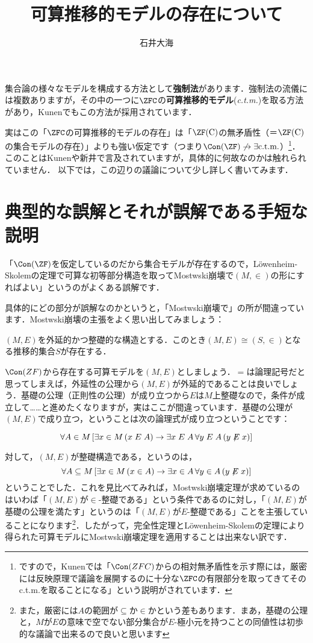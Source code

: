 \documentclass[a4j]{ltjsarticle}
\title{可算推移的モデルの存在について}
\author{石井大海}
\begin{document}
\maketitle

集合論の様々なモデルを構成する方法として\textbf{強制法}があります．強制法の流儀には複数ありますが，その中の一つに$\ZFC$の\textbf{可算推移的モデル}(\textit{c.t.m.})を取る方法があり，Kunen\cite{Kunen:2011}でもこの方法が採用されています．

実はこの「$\ZFC$の可算推移的モデルの存在」は「$\ZF(\mathrm{C})$の無矛盾性（＝$\ZF(\mathrm{C})$の集合モデルの存在）」よりも強い仮定です（つまり$\Con(\ZF) \not\rightarrow \exists \text{c.t.m.}$）\footnote{ですので，Kunenでは「$\Con(ZFC)$からの相対無矛盾性を示す際には，厳密には反映原理で議論を展開するのに十分な$\ZFC$の有限部分を取ってきてそのc.t.m.を取ることになる」という説明がされています．}．このことはKunen\cite{Kunen:2011}や新井\cite{Arai:2011}で言及されていますが，具体的に何故なのかは触れられていません．
以下では，この辺りの議論について少し詳しく書いてみます．

\section{典型的な誤解とそれが誤解である手短な説明}
「$\Con(\ZF)$を仮定しているのだから集合モデルが存在するので，L\"{o}wenheim-Skolemの定理で可算な初等部分構造を取ってMostwski崩壊で$(M, \in)$の形にすればよい」というのがよくある誤解です．

具体的にどの部分が誤解なのかというと，「Mostwski崩壊で」の所が間違っています．Mostwski崩壊の主張をよく思い出してみましょう：

\begin{theorem}[Mostwski]
 $(M, E)$を外延的かつ整礎的な構造とする．このとき$(M, E) \cong (S, \in)$となる推移的集合$S$が存在する．
\end{theorem}

$\Con(ZF)$から存在する可算モデルを$(M, E)$としましょう．$=$は論理記号だと思ってしまえば，外延性の公理から$(M, E)$が外延的であることは良いでしょう．基礎の公理（正則性の公理）が成り立つから$E$は$M$上整礎なので，条件が成立して……と進めたくなりますが，実はここが間違っています．基礎の公理が$(M, E)$で成り立つ，ということは次の論理式が成り立つということです：

\[
 \forall A \in M\, [\exists x \in M\,(x \mathrel{E} A) \rightarrow \exists x \mathrel{E} A \, \forall y \mathrel{E} A\, (y \not\mathrel{E} x)]
\]

対して，$(M, E)$が整礎構造である，というのは，
\[
 \forall A \subseteq M\, [\exists x \in M\,(x \in A) \rightarrow \exists x \in A \, \forall y \in A\, (y \not\mathrel{E} x)]
\]
ということでした．これを見比べてみれば，Mostwski崩壊定理が求めているのはいわば「$(M, E)$が$\in$-整礎である」という条件であるのに対し，「$(M, E)$が基礎の公理を満たす」というのは「$(M, E)$が$E$-整礎である」ことを主張していることになります\footnote{また，厳密には$A$の範囲が$\subseteq$か$\in$かという差もあります．まあ，基礎の公理と，$M$が$E$の意味で空でない部分集合が$E$-極小元を持つことの同値性は初歩的な議論で出来るので良いと思います}．したがって，完全性定理とL\"{o}wenheim-Skolemの定理により得られた可算モデルにMostwski崩壊定理を適用することは出来ない訳です．
\end{document}
